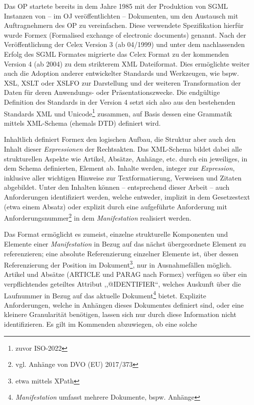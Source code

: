 Das \acf{OP} startete bereits in dem Jahre 1985 mit der Produktion von \ac{SGML} Instanzen von -- im \ac{OJ} veröffentlichten -- Dokumenten, um den Austausch mit Auftragnehmern des \ac{OP} zu vereinfachen. \cite[75]{eu_cellar, eu_fmx4_intro}
Diese verwendete Spezifikation hierfür wurde Formex (Formalised exchange of electronic documents) genannt.
Nach der Veröffentlichung der Celex Version 3 (ab 04/1999) und unter dem nachlassenden Erfolg des \ac{SGML} Formates migrierte das Celex Format zu der kommenden Version 4 (ab 2004) zu dem strikterem \ac{XML} Dateiformat.
Dies ermöglichte weiter auch die Adoption anderer entwickelter Standards und Werkzeugen, wie bspw. \ac{XSL}, \ac{XSLT} oder \ac{XSLFO} zur Darstellung und der weiteren Transformation der Daten für deren Anwendungs- oder Präsentationszwecke.
Die endgültige Definition des Standards in der Version 4 setzt sich also aus den bestehenden Standards \ac{XML} und Unicode\footnote{zuvor ISO-2022} zusammen, auf Basis dessen eine Grammatik mittels \ac{XML}-Schema (ehemals \ac{DTD}) definiert wird. \cite{eu_fmx4_intro}

Inhaltlich definiert Formex den logischen Aufbau, die Struktur aber auch den Inhalt  dieser \textit{Expressionen} der Rechtsakten.
Das \ac{XML}-Schema bildet dabei alle strukturellen Aspekte wie Artikel, Absätze, Anhänge, etc. durch ein jeweiliges, in dem Schema definierten, Element ab. 
Inhalte werden, integer zur \textit{Expression}, inklusive aller wichtigen Hinweise zur Textformatierung, Verweisen und Zitaten abgebildet. 
Unter den Inhalten können -- entsprechend dieser Arbeit -- auch Anforderungen identifiziert werden, welche entweder, implizit in dem Gesetzestext (etwa einem Absatz) oder explizit durch eine aufgeführte Anforderung mit Anforderungsnummer\footnote{vgl. Anhänge von \acs{DVO} (\acs{EU}) 2017/373} in dem \textit{Manifestation} realisiert werden.

Das Format ermöglicht es zumeist, einzelne strukturelle Komponenten und Elemente einer \textit{Manifestation} in Bezug auf das nächst übergeordnete Element zu referenzieren; eine absolute Referenzierung einzelner Elemente ist, über dessen Referenzierung der Position im Dokument\footnote{etwa mittels XPath}, nur in Ausnahmefällen möglich.
Artikel und Absätze (\textsf{ARTICLE} und \textsf{PARAG} nach Formex) verfügen so über ein verpflichtendes geteiltes Attribut ,,\textsf{@IDENTIFIER}``, welches Auskunft über die Laufnummer in Bezug auf das aktuelle Dokument\footnote{\textit{Manifestation} umfasst mehrere Dokumente, bspw. Anhänge} bietet. 
Explizite Anforderungen, welche in Anhängen dieses Dokumentes definiert sind, oder eine kleinere Granularität benötigen, lassen sich nur durch diese Information nicht identifizieren.
Es gilt im Kommenden abzuwiegen, ob eine solche 

